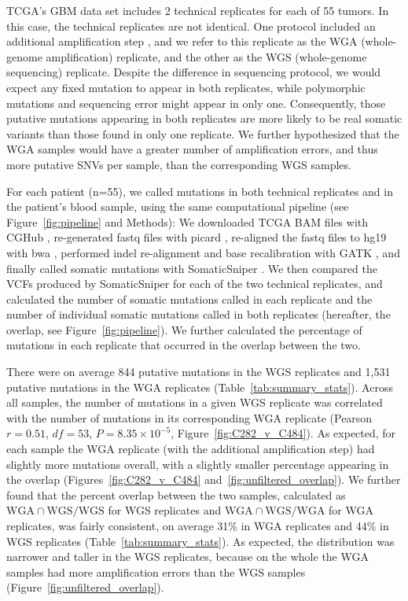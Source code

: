 \documentclass[11pt]{article} %
\begin{document}
TCGA's GBM data set includes 2 technical replicates for each of 55 tumors. In this case, the technical replicates are not identical. One protocol included an additional amplification step \citep{TCGA-GBM}, and we refer to this replicate as the WGA (whole-genome amplification) replicate, and the other as the WGS (whole-genome sequencing) replicate. Despite the difference in sequencing protocol, we would expect any fixed mutation to appear in both replicates, while polymorphic mutations and sequencing error might appear in only one. Consequently, those putative mutations appearing in both replicates are more likely to be real somatic variants than those found in only one replicate. We further hypothesized that the WGA samples would have a greater number of amplification errors, and thus more putative SNVs per sample, than the corresponding WGS samples. 

For each patient (n=55), we called mutations in both technical replicates and in the patient's blood sample, using the same computational pipeline (see Figure~\ref{fig:pipeline} and Methods): We downloaded TCGA BAM files with CGHub \citep{CGHub}, re-generated fastq files with picard \citep{picard}, re-aligned the fastq files to hg19 with bwa \citep{bwa}, performed indel re-alignment and base recalibration with GATK \citep{GATK}, and finally called somatic mutations with SomaticSniper \citep{SomaticSniper}. We then compared the VCFs produced by SomaticSniper for each of the two technical replicates, and calculated the number of somatic mutations called in each replicate and the number of individual somatic mutations called in both replicates (hereafter, the overlap, see Figure~\ref{fig:pipeline}). We further calculated the percentage of mutations in each replicate that occurred in the overlap between the two. 

There were on average 844 putative mutations in the WGS replicates and 1,531 putative mutations in the WGA replicates (Table~\ref{tab:summary_stats}). Across all samples, the number of mutations in a given WGS replicate was correlated with the number of mutations in its corresponding WGA replicate (Pearson $r=0.51$, $df=53$, $P=8.35\times10^{-5}$, Figure~\ref{fig:C282_v_C484}). As expected, for each sample the WGA replicate (with the additional amplification step) had slightly more mutations overall, with a slightly smaller percentage appearing in the overlap (Figures~\ref{fig:C282_v_C484} and~\ref{fig:unfiltered_overlap}). We further found that the percent overlap between the two samples, calculated as $\text{WGA} \cap \text{WGS}/\text{WGS}$ for WGS replicates and $\text{WGA} \cap \text{WGS}/\text{WGA}$ for WGA replicates, was fairly consistent, on average 31\% in WGA replicates and 44\% in WGS replicates (Table~\ref{tab:summary_stats}). As expected, the distribution was narrower and taller in the WGS replicates, because on the whole the WGA samples had more amplification errors than the WGS samples (Figure~\ref{fig:unfiltered_overlap}).
\end{document}
